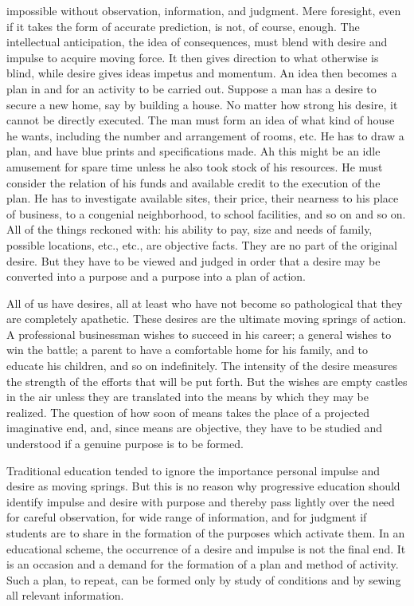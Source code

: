 impossible without observation, information, and judgment. Mere foresight, even if it 
takes the form of accurate prediction, is not, of course, enough. The intellectual 
anticipation, the idea of consequences, must blend with desire and impulse to acquire 
moving force. It then gives direction to what otherwise is blind, while desire gives ideas 
impetus and momentum. An idea then becomes a plan in and for an activity to be carried 
out. Suppose a man has a desire to secure a new home, say by building a house. No 
matter how strong his desire, it cannot be directly executed. The man must form an idea 
of what kind of house he wants, including the number and arrangement of rooms, etc. He 
has to draw a plan, and have blue prints and specifications made. Ah this might be an idle 
amusement for spare time unless he also took stock of his resources. He must consider 
the relation of his funds and available credit to the execution of the plan. He has to investigate available sites, their price, their nearness to his place of business, to a 
congenial neighborhood, to school facilities, and so on and so on. All of the things 
reckoned with: his ability to pay, size and needs of family, possible locations, etc., etc., 
are objective facts. They are no part of the original desire. But they have to be viewed 
and judged in order that a desire may be converted into a purpose and a purpose into a 
plan of action. 

All of us have desires, all at least who have not become so pathological that they are 
completely apathetic. These desires are the ultimate moving springs of action. A 
professional businessman wishes to succeed in his career; a general wishes to win the 
battle; a parent to have a comfortable home for his family, and to educate his children, 
and so on indefinitely. The intensity of the desire measures the strength of the efforts that 
will be put forth. But the wishes are empty castles in the air unless they are translated into 
the means by which they may be realized. The question of how soon of means takes the 
place of a projected imaginative end, and, since means are objective, they have to be 
studied and understood if a genuine purpose is to be formed. 

Traditional education tended to ignore the importance personal impulse and desire as 
moving springs. But this is no reason why progressive education should identify impulse 
and desire with purpose and thereby pass lightly over the need for careful observation, for 
wide range of information, and for judgment if students are to share in the formation of 
the purposes which activate them. In an educational scheme, the occurrence of a desire 
and impulse is not the final end. It is an occasion and a demand for the formation of a 
plan and method of activity. Such a plan, to repeat, can be formed only by study of 
conditions and by sewing all relevant information. 

